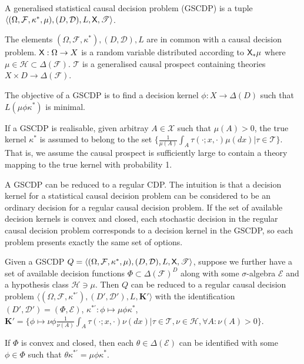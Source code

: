 \begin{definition}\label{def:gen_scdp}
A generalised statistical causal decision problem (GSCDP) is a tuple $\langle (\Omega,\mathcal{F},\kappa^*,\mu), (D,\mathcal{D}), L, \mathsf{X}, \mathscr{T} \rangle$.

The elements $(\Omega, \mathcal{F},\kappa^*), (D,\mathcal{D}), L$ are in common with a causal decision problem. $\mathsf{X}:\Omega\to X$ is a random variable distributed according to $\mathsf{X}_*\mu$ where $\mu\in \mathscr{H}\subset \Delta(\mathcal{F})$. $\mathscr{T}$ is a generalised causal prospect containing theories $X\times D\to \Delta(\mathcal{F})$.

The objective of a GSCDP is to find a decision kernel $\phi:X\to \Delta(D)$ such that $L(\mu\phi\kappa^*)$ is minimal.

If a GSCDP is realisable, given arbitray $A\in \mathcal{X}$ such that $\mu(A)>0$, the true kernel $\kappa^*$ is assumed to belong to the set $\{\frac{1}{\mu(A)}\int_A \tau(\cdot;x,\cdot)\mu(dx)|\tau\in\mathscr{T}\}$. That is, we assume the causal prospect is sufficiently large to contain a theory mapping to the true kernel with probability 1.
\end{definition}

A GSCDP can be reduced to a regular CDP. The intuition is that a decision kernel for a statistical causal decision problem can be considered to be an ordinary decision for a regular causal decision problem. If the set of available decision kernels is convex and closed, each stochastic decision in the regular causal decision problem corresponds to a decision kernel in the GSCDP, so each problem presents exactly the same set of options.

\begin{theorem}\label{th:gscdp_to_cdp}
Given a GSCDP $Q=\langle (\Omega,\mathcal{F},\kappa^*,\mu), (D,\mathcal{D}), L, \mathsf{X}, \mathscr{T} \rangle$, suppose we further have a set of available decision functions $\Phi\subset \Delta(\mathcal{F})^D$ along with some $\sigma$-algebra $\mathcal{E}$ and a hypothesis class $\mathscr{H}\ni \mu$. Then $Q$ can be reduced to a regular causal decision problem $\langle (\Omega,\mathcal{F},\kappa^{*\prime}), (D',\mathcal{D}'), L, \mathbf{K}' \rangle$ with the identification $(D',\mathcal{D}') = (\Phi,\mathcal{E})$, $\kappa^{*\prime}:\phi\mapsto \mu\phi \kappa^*$, $\mathbf{K}' = \{\phi\mapsto \nu\phi\frac{1}{\nu(A)}\int_A\tau(\cdot;x,\cdot)\nu(dx)|\tau\in\mathscr{T},\nu\in \mathscr{H},\forall A:\nu(A)>0\}$.

If $\Phi$ is convex and closed, then each $\theta\in \Delta(\mathcal{E})$ can be identified with some $\phi\in \Phi$ such that $\theta\kappa^{*\prime} = \mu\phi\kappa^*$.
\end{theorem}

